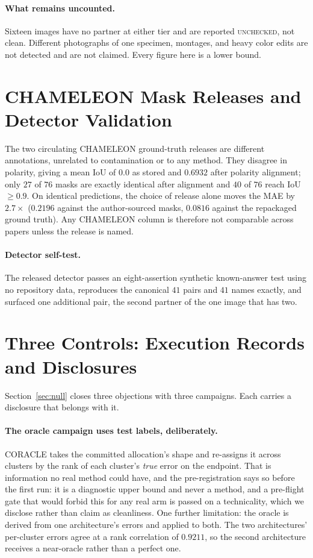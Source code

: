 \documentclass{article}
\begin{document}
\paragraph{What remains uncounted.} Sixteen images have no partner at either tier and are reported
\textsc{unchecked}, not clean. Different photographs of one specimen, montages, and heavy color edits
are not detected and are not claimed. Every figure here is a lower bound.


\section{CHAMELEON Mask Releases and Detector Validation}
\label{app:masks}

The two circulating CHAMELEON ground-truth releases are different annotations, unrelated to
contamination or to any method. They disagree in polarity, giving a mean IoU of $0.0$ as stored and
$0.6932$ after polarity alignment; only $27$ of $76$ masks are exactly identical after alignment and
$40$ of $76$ reach IoU $\geq 0.9$. On identical predictions, the choice of release alone moves the MAE by
$2.7\times$ ($0.2196$ against the author-sourced masks, $0.0816$ against the repackaged ground truth).
Any CHAMELEON column is therefore not comparable across papers unless the release is named.

\paragraph{Detector self-test.} The released detector passes an eight-assertion synthetic
known-answer test using no repository data, reproduces the canonical $41$ pairs and $41$ names exactly, and surfaced one additional pair, the second partner of the one image that has two.

\section{Three Controls: Execution Records and Disclosures}
\label{app:controls}

Section~\ref{sec:null} closes three objections with three campaigns. Each carries a disclosure that
belongs with it.

\paragraph{The oracle campaign uses test labels, deliberately.} CORACLE takes the committed
allocation's shape and re-assigns it across clusters by the rank of each cluster's \emph{true} error
on the endpoint. That is information no real method could have, and the pre-registration says so
before the first run: it is a diagnostic upper bound and never a method, and a pre-flight gate that
would forbid this for any real arm is passed on a technicality, which we disclose rather than claim
as cleanliness. One further limitation: the oracle is derived from one architecture's errors and
applied to both. The two architectures' per-cluster errors agree at a rank correlation of $0.9211$,
so the second architecture receives a near-oracle rather than a perfect one.
\end{document}
